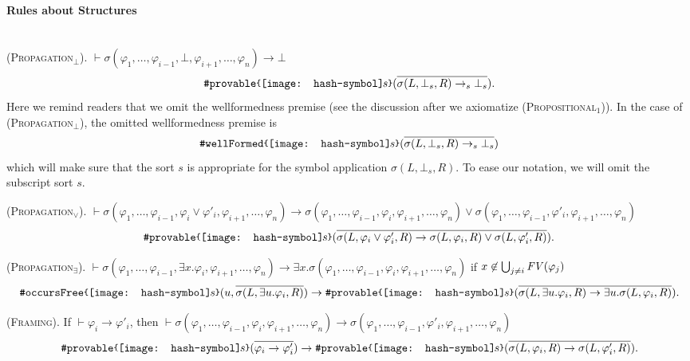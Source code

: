 \documentclass[UTF8,11pt]{article}
\theoremstyle{plain}
\theoremstyle{definition}
\theoremstyle{remark}
\newcommand{\imp}{\to}
\newcommand{\ddd}{,\dots,}
\newcommand{\parametric}[2]{{#1}\raisebox{.2ex}{\texttt{\footnotesize{\{}}}#2\raisebox{.2ex}{\texttt{\footnotesize{\}}}}}
\newcommand{\shp}{\texttt{[image: hash-symbol]}\kern-0.1em}
\newcommand{\sharpsymbol}{\#}
\newcommand{\shs}{\shp s}
\newcommand{\KoccursFree}{\texttt{\sharpsymbol occursFree}}
\newcommand{\KwellFormed}{\texttt{\sharpsymbol wellFormed}}
\newcommand{\Kdeduce}{\textup{\texttt{\sharpsymbol provable}}}
\newcommand{\FV}{{\it FV}}
\begin{document}
\paragraph{Rules about Structures}\quad
\\

(\textsc{Propagation$_\bot$}).\quad
$\vdash 
 \sigma(
 \varphi_1 \ddd \varphi_{i-1},
 \bot,
 \varphi_{i+1} \ddd \varphi_n) \imp \bot$ 
\begin{equation*}
\parametric{\Kdeduce}{\shs}(
\overline{
\sigma(L,\bot_s,R) \imp_s \bot_s
}).
\end{equation*}
Here we remind readers that we omit 
the wellformedness premise (see the discussion
after we axiomatize (\textsc{Propositional$_1$})).
In the case of (\textsc{Propagation$_\bot$}),
the omitted wellformedness premise is
$$
\parametric{\KwellFormed}{\shs}
(
\overline{
\sigma(L,\bot_s,R) \imp_s \bot_s
}
)
$$
which will make sure that the sort $s$ is appropriate for the symbol application
$\sigma(L,\bot_s,R)$.
To ease our notation, we will omit the subscript sort $s$.

(\textsc{Propagation$_\vee$}).\quad
$\vdash 
\sigma(
\varphi_1 \ddd \varphi_{i-1},
\varphi_i \vee \varphi'_i,
\varphi_{i+1} \ddd \varphi_n) \imp
\sigma(
\varphi_1 \ddd \varphi_{i-1},
\varphi_i,
\varphi_{i+1} \ddd \varphi_n)
\vee
\sigma(
\varphi_1 \ddd \varphi_{i-1},
\varphi'_i,
\varphi_{i+1} \ddd \varphi_n)
$ 
\begin{equation*}
\parametric{\Kdeduce}{\shs}(
\overline{
	\sigma(L,\varphi_i \vee \varphi'_i,R) \imp
	\sigma(L, \varphi_i, R) \vee \sigma(L, \varphi'_i, R)
}).
\end{equation*}

(\textsc{Propagation$_\exists$}).\quad
$\vdash 
\sigma(
\varphi_1 \ddd \varphi_{i-1},
\exists x . \varphi_i,
\varphi_{i+1} \ddd \varphi_n) \imp
\exists x .
\sigma(
\varphi_1 \ddd \varphi_{i-1},
\varphi_i,
\varphi_{i+1} \ddd \varphi_n)
$
if $x \not\in \bigcup_{j \neq i}\FV(\varphi_j)$
\begin{equation*}
\parametric{\KoccursFree}{\shs}(
u,
\overline{\sigma(L,\exists u . \varphi_i,R)}
)
\imp
\parametric{\Kdeduce}{\shs}(
\overline{
	\sigma(L,\exists u . \varphi_i,R) \imp
	\exists u . \sigma(L, \varphi_i, R)
}).
\end{equation*}

(\textsc{Framing}).\quad
If $\vdash \varphi_i \imp \varphi'_i$,
then 
$\vdash
\sigma(
\varphi_1 \ddd \varphi_{i-1},
\varphi_i,
\varphi_{i+1} \ddd \varphi_n)
\imp
\sigma(
\varphi_1 \ddd \varphi_{i-1},
\varphi'_i,
\varphi_{i+1} \ddd \varphi_n)
$
\begin{equation*}
\parametric{\Kdeduce}{\shs}(
\overline{
\varphi_i \imp \varphi'_i
}
)
\imp
\parametric{\Kdeduce}{\shs}(
\overline{
\sigma(L,\varphi_i,R) \imp
\sigma(L,\varphi'_i,R)
}).
\end{equation*}
\end{document}
